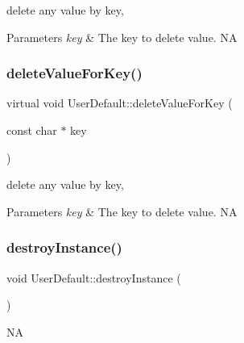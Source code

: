 delete any value by key, 
\begin{DoxyParams}{Parameters}
{\em key} & The key to delete value.  NA \\
\hline
\end{DoxyParams}
\mbox{\label{classUserDefault_a15473f415e18246ce2ee0d9f4e9cafe4}} 
\subsubsection{\texorpdfstring{delete\+Value\+For\+Key()}{deleteValueForKey()}\hspace{0.1cm}{\footnotesize\ttfamily [2/2]}}
{\footnotesize\ttfamily virtual void User\+Default\+::delete\+Value\+For\+Key (\begin{DoxyParamCaption}\item[{const char $\ast$}]{key }\end{DoxyParamCaption})\hspace{0.3cm}{\ttfamily [virtual]}}

delete any value by key, 
\begin{DoxyParams}{Parameters}
{\em key} & The key to delete value.  NA \\
\hline
\end{DoxyParams}
\mbox{\label{classUserDefault_abaf8b97d4b852484a503eb41e6bfb1ae}} 
\subsubsection{\texorpdfstring{destroy\+Instance()}{destroyInstance()}\hspace{0.1cm}{\footnotesize\ttfamily [1/2]}}
{\footnotesize\ttfamily void User\+Default\+::destroy\+Instance (\begin{DoxyParamCaption}{ }\end{DoxyParamCaption})\hspace{0.3cm}{\ttfamily [static]}}

NA \mbox{\label{classUserDefault_a3d11a0b35e577d5bf50ba19bc5343bf7}} 
